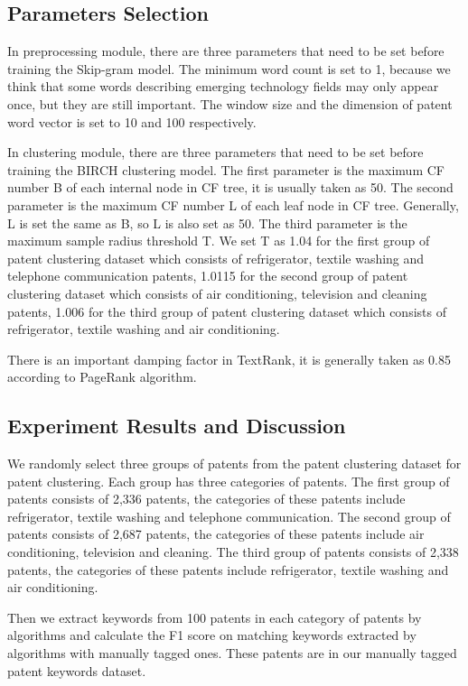 \documentclass[conference]{IEEEtran}
\begin{document}
\begin{CJK}{UTF8}{gbsn}
	\subsection{Parameters Selection}
	In preprocessing module, there are three parameters that need to be set before training the Skip-gram model. The minimum word count is set to 1, because we think that some words describing emerging technology fields may only appear once, but they are still important. The window size and the dimension of patent word vector is set to 10 and 100 respectively.
	
	In clustering module, there are three parameters that need to be set before training the BIRCH clustering model. The first parameter is the maximum CF number B of each internal node in CF tree, it is usually taken as 50. The second parameter is the maximum CF number L of each leaf node in CF tree. Generally, L is set the same as B, so L is also set as 50. The third parameter is the maximum sample radius threshold T. We set T as 1.04 for the first group of patent clustering dataset which consists of refrigerator, textile washing and telephone communication patents, 1.0115 for the second group of patent clustering dataset which consists of air conditioning, television and cleaning patents, 1.006 for the third group of patent clustering dataset which consists of refrigerator, textile washing and air conditioning.
	
	There is an important damping factor in TextRank, it is generally taken as 0.85 according to PageRank algorithm.
	\subsection{Experiment Results and Discussion}
	We randomly select three groups of patents from the patent clustering dataset for patent clustering. Each group has three categories of patents. The first group of patents consists of 2,336 patents, the categories of these patents include refrigerator, textile washing and telephone communication. The second group of patents consists of 2,687 patents, the categories of these patents include air conditioning, television and cleaning. The third group of patents consists of 2,338 patents, the categories of these patents include refrigerator, textile washing and air conditioning.
	
	Then we extract keywords from 100 patents in each category of patents by algorithms and calculate the F1 score on matching keywords extracted by algorithms with manually tagged ones. These patents are in our manually tagged patent keywords dataset.
	

\end{CJK}
\end{document}
